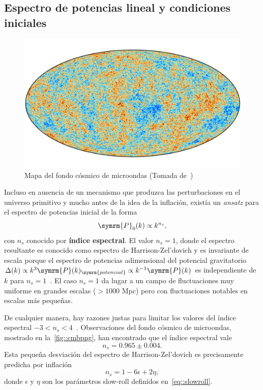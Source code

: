 \subsection{Espectro de potencias lineal y condiciones iniciales}
\begin{figure}[t]
    \centering
    \includegraphics[scale=.7]{img/Cmb_inpaint_T_smica_v1-min.png}
    \caption[Mapa del fondo cósmico de microondas]{Mapa del fondo cósmico de microondas (Tomada de~\cite{collaboration2020planck4})}
    \label{fig::cmbpng}
\end{figure}
Incluso en ausencia de un mecanismo que produzca las perturbaciones en el universo primitivo y mucho antes de la idea de la inflación, existía un \textit{ansatz} para el espectro de potencias inicial de la forma~\cite{harrison1970,zel1970hypothesis,peebles1970primeval}
\begin{equation}
    \symrm{P}_0(k)\propto k^{n_s},
\end{equation}
con \(n_s\) conocido por \textbf{índice espectral}. El valor \(n_s=1\), donde el espectro resultante es conocido como espectro de Harrison-Zel'dovich y es invariante de escala porque el espectro de potencias adimensional del potencial gravitatorio \(\Delta(k)\propto k^3\symrm{P}(k)_{\symrm{potencial}}\propto k^{-1}\symrm{P}(k)\) es independiente de \(k\) para \(n_s=1\)~\cite{baumann2022cosmology}. El caso \(n_s=1\) da lugar a un campo de fluctuaciones muy uniforme en grandes escalas (\(>1000\) Mpc) pero con fluctuaciones notables en escalas más pequeñas.

De cualquier manera, hay razones justas para limitar los valores del índice espectral \(-3<n_s<4\)~\cite{peacock1998cosmological}. Observaciones del fondo cósmico de microondas, mostrado en la~\autoref{fig::cmbpng}, han encontrado que el índice espectral vale~\cite{collaboration2020planck}
\begin{equation}
    n_s=0.965\pm 0.004.\label{eq::theoryns}
\end{equation}
Esta pequeña desviación del espectro de Harrison-Zel'dovich es precisamente predicha por inflación
\begin{equation}
    n_s=1-6\epsilon+2\eta,
\end{equation}
donde \(\epsilon\) y \(\eta\) son los parámetros slow-roll definidos en~\ref{eq::slowroll}.

